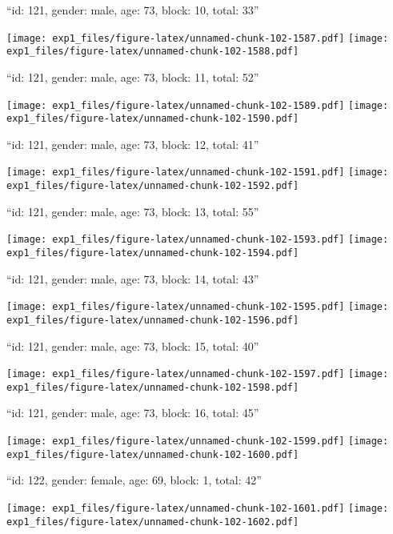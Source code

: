 \documentclass[11pt,,]{article}
\begin{document}
\newpage
[1] 

``id: 121, gender: male, age: 73, block: 10, total: 33''

\texttt{[image: exp1\_files/figure-latex/unnamed-chunk-102-1587.pdf]}
\texttt{[image: exp1\_files/figure-latex/unnamed-chunk-102-1588.pdf]}

\newpage
[1] 

``id: 121, gender: male, age: 73, block: 11, total: 52''

\texttt{[image: exp1\_files/figure-latex/unnamed-chunk-102-1589.pdf]}
\texttt{[image: exp1\_files/figure-latex/unnamed-chunk-102-1590.pdf]}

\newpage
[1] 

``id: 121, gender: male, age: 73, block: 12, total: 41''

\texttt{[image: exp1\_files/figure-latex/unnamed-chunk-102-1591.pdf]}
\texttt{[image: exp1\_files/figure-latex/unnamed-chunk-102-1592.pdf]}

\newpage
[1] 

``id: 121, gender: male, age: 73, block: 13, total: 55''

\texttt{[image: exp1\_files/figure-latex/unnamed-chunk-102-1593.pdf]}
\texttt{[image: exp1\_files/figure-latex/unnamed-chunk-102-1594.pdf]}

\newpage
[1] 

``id: 121, gender: male, age: 73, block: 14, total: 43''

\texttt{[image: exp1\_files/figure-latex/unnamed-chunk-102-1595.pdf]}
\texttt{[image: exp1\_files/figure-latex/unnamed-chunk-102-1596.pdf]}

\newpage
[1] 

``id: 121, gender: male, age: 73, block: 15, total: 40''

\texttt{[image: exp1\_files/figure-latex/unnamed-chunk-102-1597.pdf]}
\texttt{[image: exp1\_files/figure-latex/unnamed-chunk-102-1598.pdf]}

\newpage
[1] 

``id: 121, gender: male, age: 73, block: 16, total: 45''

\texttt{[image: exp1\_files/figure-latex/unnamed-chunk-102-1599.pdf]}
\texttt{[image: exp1\_files/figure-latex/unnamed-chunk-102-1600.pdf]}

\newpage
[1] 

``id: 122, gender: female, age: 69, block: 1, total: 42''

\texttt{[image: exp1\_files/figure-latex/unnamed-chunk-102-1601.pdf]}
\texttt{[image: exp1\_files/figure-latex/unnamed-chunk-102-1602.pdf]}
\end{document}
